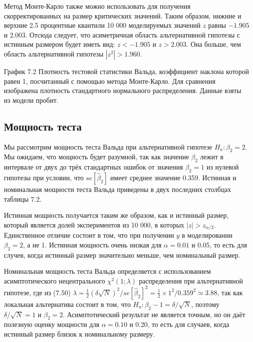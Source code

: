 Метод Монте-Карло также можно использовать для получения скорректированных на размер критических значений. Таким образом, нижние и верхние 2.5 процентные квантили 10 000 моделируемых значений $z$ равны $- 1.905$ и $2.003$. Отсюда следует, что асиметричная область альтернативной гипотезы с истинным размером будет иметь вид: $z < - 1.905$ и $z > 2.003$. Она больше, чем область альтернативной гипотезы $|z^2| > 1.960$.



\vspace{5cm}




График 7.2 Плотность тестовой статистики Вальда, коэффициент наклона которой равен 1, посчитанный с помощью метода Монте-Карло. Для сравнения изображена плотность стандартного нормального распределения. Данные взяты из модели пробит.

\subsection{Мощность теста}

Мы рассмотрим мощность теста Вальда при альтернативной гипотезе $H_a: \beta_2 = 2$. Мы ожидаем, что мощность будет разумной, так как значение $\beta_2$ лежит в интервале от двух до трёх стандартных ошибок от значения $\beta_2 = 1$ из нулевой гипотезы при условии, что $se[\hat{\beta}_2]$ имеет среднее значение 0.359. Истинная и номинальная мощности теста Вальда приведены в двух последних столбцах таблицы 7.2.

Истинная мощность получается таким же образом, как и истинный размер, который является долей экспериментов из 10 000, в которых $|z| > z_{\alpha/2}$. Единственное отличие состоит в том, что при получении $y$ в моделировании $\beta_2 =2$, а не 1. Истинная мощность очень низкая для $\alpha = 0.01$ и 0.05, то есть для случев, когда истинный размер значительно меньше, чем номинальный размер.

Номинальная мощность теста Вальда определяется с использованием асимптотического нецентрального $\chi^2 (1; \lambda)$ распределения при альтернативной гипотезе, где из (7.50) $\lambda = \frac{1}{2}(\delta \sqrt{N})^2/ se[\hat{\beta}_2]^2 = \frac{1}{2} \times 1^2/0.359^2 \simeq 3.88$, так как локальная альтернатива состоит в том, что  $H_a: \beta_2 - 1 = \delta / \sqrt{N}$, поэтому $\delta / \sqrt{N} = 1$ и $\beta_2 = 2$. Асимптотический результат не является точным, но он даёт полезную оценку мощности для  $\alpha = 0.10$ и 0.20, то есть для случаев, когда истинный размер близок к номинальному размеру.

